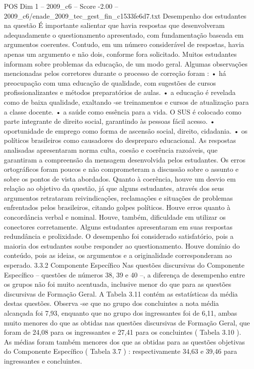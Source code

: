 \begin{textsample}{POS Dim 1 – 2009\_c6 – Score -2.00 – 2009\_c6/enade\_2009\_tec\_gest\_fin\_c1533fe6d7.txt}
Desempenho dos estudantes na questão É importante salientar que havia respostas que desenvolveram adequadamente o questionamento apresentado, com fundamentação baseada em argumentos coerentes.
Contudo, em um número considerável de respostas, havia apenas um argumento e não dois, conforme fora solicitado.
Muitos estudantes informam sobre problemas da educação, de um modo geral.
Algumas observações mencionadas pelos corretores durante o processo de correção foram : • há preocupação com uma educação de qualidade, com sugestões de cursos profissionalizantes e métodos preparatórios de aulas. • a educação é revelada como de baixa qualidade, exaltando -se treinamentos e cursos de atualização para a classe docente. • a saúde como essência para a vida.
O SUS é colocado como parte integrante de direito social, garantindo às pessoas fácil acesso. • oportunidade de emprego como forma de ascensão social, direito, cidadania. • os políticos brasileiros como causadores do despreparo educacional.
As respostas analisadas apresentaram norma culta, coesão e coerência razoáveis, que garantiram a compreensão da mensagem desenvolvida pelos estudantes.
Os erros ortográficos foram poucos e não comprometeram a discussão sobre o assunto e sobre os pontos de vista abordados.
Quanto à coerência, houve um desvio em relação ao objetivo da questão, já que alguns estudantes, através dos seus argumentos retrataram reivindicações, reclamações e situações de problemas enfrentados pelos brasileiros, citando golpes políticos.
Houve erros quanto à concordância verbal e nominal.
Houve, também, dificuldade em utilizar os conectores corretamente.
Alguns estudantes apresentaram em suas respostas redundância e prolixidade.
O desempenho foi considerado satisfatório, pois a maioria dos estudantes soube responder ao questionamento.
Houve domínio do conteúdo, pois as ideias, os argumentos e a originalidade corresponderam ao esperado. 3.3.2 Componente Específico Nas questões discursivas do Componente Específico – questões de números 38, 39 e 40 –, a diferença de desempenho entre os grupos não foi muito acentuada, inclusive menor do que para as questões discursivas de Formação Geral.
A Tabela 3.11 contém as estatísticas da média destas questões.
Observa -se que no grupo dos concluintes a nota média alcançada foi 7,93, enquanto que no grupo dos ingressantes foi de 6,11, ambas muito menores do que as obtidas nas questões discursivas de Formação Geral, que foram de 24,08 para os ingressantes e 27,41 para os concluintes ( Tabela 3.10 ).
As médias foram também menores dos que as obtidas para as questões objetivas do Componente Específico ( Tabela 3.7 ) : respectivamente 34,63 e 39,46 para ingressantes e concluintes.

\end{textsample}
